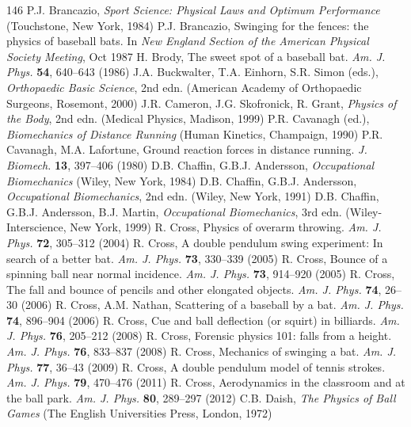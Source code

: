 \documentclass[12pt]{book}
\begin{document}
\begin{thebibliography}{146}
 P.J. Brancazio, \textit{Sport Science: Physical Laws and Optimum Performance} (Touchstone, New York, 1984)
 P.J. Brancazio, Swinging for the fences: the physics of baseball bats. In \textit{New England Section of the American Physical Society Meeting}, Oct 1987
 H. Brody, The sweet spot of a baseball bat. \textit{Am. J. Phys.} \textbf{54}, 640--643 (1986)
 J.A. Buckwalter, T.A. Einhorn, S.R. Simon (eds.), \textit{Orthopaedic Basic Science}, 2nd edn. (American Academy of Orthopaedic Surgeons, Rosemont, 2000)
 J.R. Cameron, J.G. Skofronick, R. Grant, \textit{Physics of the Body}, 2nd edn. (Medical Physics, Madison, 1999)
 P.R. Cavanagh (ed.), \textit{Biomechanics of Distance Running} (Human Kinetics, Champaign, 1990)
 P.R. Cavanagh, M.A. Lafortune, Ground reaction forces in distance running. \textit{J. Biomech.} \textbf{13}, 397--406 (1980)
 D.B. Chaffin, G.B.J. Andersson, \textit{Occupational Biomechanics} (Wiley, New York, 1984)
 D.B. Chaffin, G.B.J. Andersson, \textit{Occupational Biomechanics}, 2nd edn. (Wiley, New York, 1991)
 D.B. Chaffin, G.B.J. Andersson, B.J. Martin, \textit{Occupational Biomechanics}, 3rd edn. (Wiley-Interscience, New York, 1999)
 R. Cross, Physics of overarm throwing. \textit{Am. J. Phys.} \textbf{72}, 305--312 (2004)
 R. Cross, A double pendulum swing experiment: In search of a better bat. \textit{Am. J. Phys.} \textbf{73}, 330--339 (2005)
 R. Cross, Bounce of a spinning ball near normal incidence. \textit{Am. J. Phys.} \textbf{73}, 914--920 (2005)
 R. Cross, The fall and bounce of pencils and other elongated objects. \textit{Am. J. Phys.} \textbf{74}, 26--30 (2006)
 R. Cross, A.M. Nathan, Scattering of a baseball by a bat. \textit{Am. J. Phys.} \textbf{74}, 896--904 (2006)
 R. Cross, Cue and ball deflection (or squirt) in billiards. \textit{Am. J. Phys.} \textbf{76}, 205--212 (2008)
 R. Cross, Forensic physics 101: falls from a height. \textit{Am. J. Phys.} \textbf{76}, 833--837 (2008)
 R. Cross, Mechanics of swinging a bat. \textit{Am. J. Phys.} \textbf{77}, 36--43 (2009)
 R. Cross, A double pendulum model of tennis strokes. \textit{Am. J. Phys.} \textbf{79}, 470--476 (2011)
 R. Cross, Aerodynamics in the classroom and at the ball park. \textit{Am. J. Phys.} \textbf{80}, 289--297 (2012)
 C.B. Daish, \textit{The Physics of Ball Games} (The English Universities Press, London, 1972)

\end{thebibliography}
\end{document}
